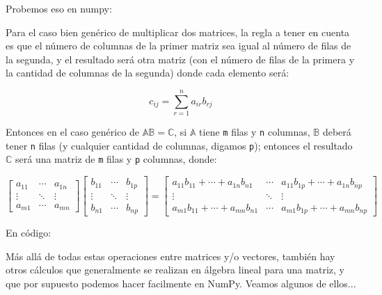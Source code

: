 Probemos eso en numpy:


Para el caso bien genérico de multiplicar dos matrices, la regla a tener en cuenta es que el número de columnas de la primer matriz sea igual al número de filas de la segunda, y el resultado será otra matriz (con el número de filas de la primera y la cantidad de columnas de la segunda) donde cada elemento será:

\begin{equation*}
    c_{ij} = \sum_{r=1}^{n}a_{ir}b_{rj}
\end{equation*}

Entonces en el caso genérico de $\mathbb{AB=C}$, si $\mathbb{A}$ tiene \verb|m| filas y \verb|n| columnas, $\mathbb{B}$ deberá tener \verb|n| filas (y cualquier cantidad de columnas, digamos \verb|p|); entonces el resultado $\mathbb{C}$ será una matriz de \verb|m| filas y \verb|p| columnas, donde:

\begin{equation*}
    \begin{bmatrix}
        a_{11} & \cdots & a_{1n}  \\
        \vdots & \ddots & \vdots  \\
        a_{m1} & \cdots & a_{mn}
    \end{bmatrix}
    \begin{bmatrix}
        b_{11} & \cdots & b_{1p}  \\
        \vdots & \ddots & \vdots  \\
        b_{n1} & \cdots & b_{np}
    \end{bmatrix}
    =
    \begin{bmatrix}
        a_{11}b_{11} + \cdots + a_{1n}b_{n1} & \cdots & a_{11}b_{1p} + \cdots + a_{1n}b_{np} \\
        \vdots & \ddots & \vdots  \\
        a_{m1}b_{11} + \cdots + a_{mn}b_{n1} & \cdots & a_{m1}b_{1p} + \cdots + a_{mn}b_{np}
    \end{bmatrix}
\end{equation*}


En código:


Más allá de todas estas operaciones entre matrices y/o vectores, también hay otros cálculos que generalmente se realizan en álgebra lineal para una matriz, y que por supuesto podemos hacer facilmente en NumPy. Veamos algunos de ellos...

